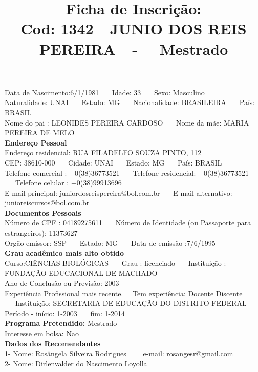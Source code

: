 \documentclass[11pt]{article}
\title{\vspace*{-4cm} Ficha de Inscrição: \\Cod: 1342\ \ JUNIO DOS REIS PEREIRA\ \ - \ \ Mestrado 
 }
\date{}
\begin{document}
\maketitle
\vspace*{-1.5cm}
\noindent Data de Nascimento:6/1/1981
\ \ \ Idade: 33   \ \ \ Sexo: Masculino
\\
Naturalidade: UNAI  
\ \ \  Estado: MG
\ \ \  Nacionalidade: BRASILEIRA
\ \ \ País: BRASIL
\\        
Nome do pai : LEONIDES PEREIRA CARDOSO
\ \ \ Nome da mãe: MARIA PEREIRA DE MELO          
\\[0.2cm]                     
\textbf{Endereço Pessoal} 
\\ 
\noindent Endereço residencial: RUA FILADELFO SOUZA PINTO, 112
\\
        CEP: 38610-000 
\ \ \ Cidade: UNAI 
\ \ \ Estado: MG 
\ \ \ País: BRASIL
\\		
		Telefone comercial : +0(38)36773521
\ \ \ Telefone residencial: +0(38)36773521
\ \ \ Telefone celular : +0(38)99913696
\\
E-mail principal: juniordosreispereira@bol.com.br
\ \ \ E-mail alternativo: junioreiscursos@bol.com.br 
\\[0.2cm] 
\textbf{Documentos Pessoais}
\\
\noindent Número de CPF : 04189275611
\ \ \ Número de Identidade (ou Passaporte para estrangeiros): 11373627
\\
Orgão emissor: SSP
\ \ \ Estado: MG
\ \ \ Data de emissão :7/6/1995
\\[0.3cm]
\textbf{Grau acadêmico mais alto obtido}
\\	
Curso:CIÊNCIAS BIOLÓGICAS
\ \ \ Grau : licenciado
\ \ \ Instituição : FUNDAÇÃO EDUCACIONAL DE MACHADO
\\			
Ano de Conclusão ou Previsão: 2003
\\ 
Experiência Profissional mais recente. \ \  
Tem experiência: Docente Discente  
\ \ \ Instituição: SECRETARIA DE EDUCAÇÃO DO DISTRITO FEDERAL
\\  
Período - início: 1-2003
\ \ \ fim: 1-2014
\\[0.2cm] 
\textbf{Programa Pretendido:} Mestrado\\
Interesse em bolsa: Nao
\\[0.3cm]		
\textbf{Dados dos Recomendantes} 
\\
1- Nome: Rosângela Silveira Rodrigues
\ \ \ \  e-mail: rosangesr@gmail.com 
\\
2- Nome: Dirlenvalder do Nascimento Loyolla
\end{document}
